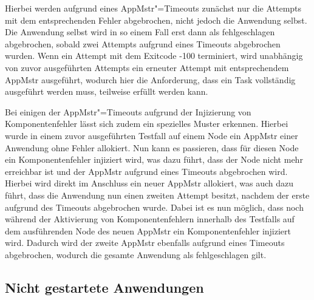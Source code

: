 Hierbei werden aufgrund eines \gls{AppMstr}"=Timeouts zunächst nur die \glspl{Attempt} mit dem entsprechenden Fehler abgebrochen, nicht jedoch die \gls{Anwendung} selbst.
Die \gls{Anwendung} selbst wird in so einem Fall erst dann als fehlgeschlagen abgebrochen, sobald zwei \glspl{Attempt} aufgrund eines Timeouts abgebrochen wurden.
Wenn ein \gls{Attempt} mit dem Exitcode -100 terminiert, wird unabhängig von zuvor ausgeführten \glspl{Attempt} ein erneuter \gls{Attempt} mit entsprechendem \gls{AppMstr} ausgeführt, wodurch hier die Anforderung, dass ein Task vollständig ausgeführt werden muss, teilweise erfüllt werden kann.

Bei einigen der \gls{AppMstr}"=Timeouts aufgrund der Injizierung von Komponentenfehler lässt sich zudem ein spezielles Muster erkennen.
Hierbei wurde in einem zuvor ausgeführten \gls{Testfall} auf einem Node ein \gls{AppMstr} einer \gls{Anwendung} ohne Fehler allokiert.
Nun kann es passieren, dass für diesen Node ein Komponentenfehler injiziert wird, was dazu führt, dass der Node nicht mehr erreichbar ist und der \gls{AppMstr} aufgrund eines Timeouts abgebrochen wird.
Hierbei wird direkt im Anschluss ein neuer \gls{AppMstr} allokiert, was auch dazu führt, dass die \gls{Anwendung} nun einen zweiten \gls{Attempt} besitzt, nachdem der erste aufgrund des Timeouts abgebrochen wurde.
Dabei ist es nun möglich, dass noch während der Aktivierung von Komponentenfehlern innerhalb des Testfalls auf dem ausführenden Node des neuen \gls{AppMstr} ein Komponentenfehler injiziert wird.
Dadurch wird der zweite \gls{AppMstr} ebenfalls aufgrund eines Timeouts abgebrochen, wodurch die gesamte Anwendung als fehlgeschlagen gilt.

\subsection{Nicht gestartete Anwendungen}
\label{subsec:notStartedApps}

